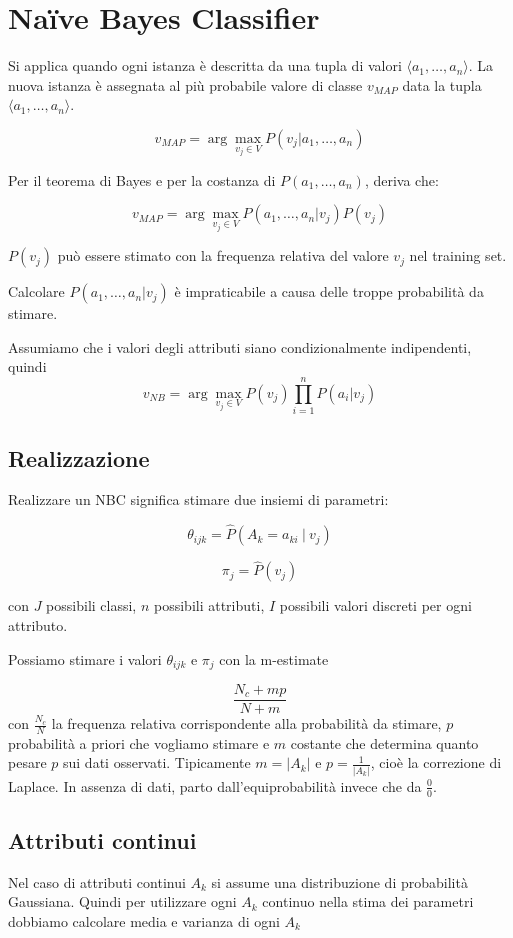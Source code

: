 \documentclass[11pt,onecolumn,a4paper,oneside]{book}
\begin{document}
\section{Na\"{i}ve Bayes Classifier}
Si applica quando ogni istanza è descritta da una tupla di valori $\langle a_1, \dots, a_n \rangle$.
La nuova istanza è assegnata al più probabile valore di classe $v_{MAP}$ data la tupla $\langle a_1, \dots, a_n \rangle$.

$$ v_{MAP} = \arg\max_{v_j \in V} P(v_j | a_1, \dots, a_n ) $$

Per il teorema di Bayes e per la costanza di $P( a_1, \dots, a_n )$, deriva che:

$$ v_{MAP} = \arg\max_{v_j \in V} P( a_1, \dots, a_n | v_j ) P(v_j) $$

$P(v_j)$ può essere stimato con la frequenza relativa del valore $v_j$ nel training set.

Calcolare $P( a_1, \dots, a_n | v_j )$ è impraticabile a causa delle troppe probabilità da stimare.

Assumiamo che i valori degli attributi siano condizionalmente indipendenti, quindi
$$v_{NB} = \arg\max_{v_j \in V} P(v_j)\prod_{i=1}^n P(a_i|v_j)$$

\subsection{Realizzazione}
Realizzare un NBC significa stimare due insiemi di parametri:

$$\theta_{ijk} = \hat P (A_k = a_{ki} ~ | ~ v_j ) $$

$$\pi_j = \hat P(v_j)$$

con $J$ possibili classi, $n$ possibili attributi, $I$ possibili valori discreti per ogni attributo.

Possiamo stimare i valori $\theta_{ijk}$ e $\pi_j$ con la m-estimate

$$\frac{N_c + mp}{N+m}$$
con $\frac{N_c}{N}$ la frequenza relativa corrispondente alla probabilità da stimare, $p$ probabilità a priori che vogliamo stimare e $m$ costante che determina quanto pesare $p$ sui dati osservati. Tipicamente $m=|A_k|$ e $p=\frac{1}{|A_k|}$, cioè la correzione di Laplace. In assenza di dati, parto dall'equiprobabilità invece che da $\frac{0}{0}$.

\subsection{Attributi continui}
Nel caso di attributi continui $A_k$ si assume una distribuzione di probabilità Gaussiana.
Quindi per utilizzare ogni $A_k$ continuo nella stima dei parametri dobbiamo calcolare media e varianza di ogni $A_k$
\end{document}

